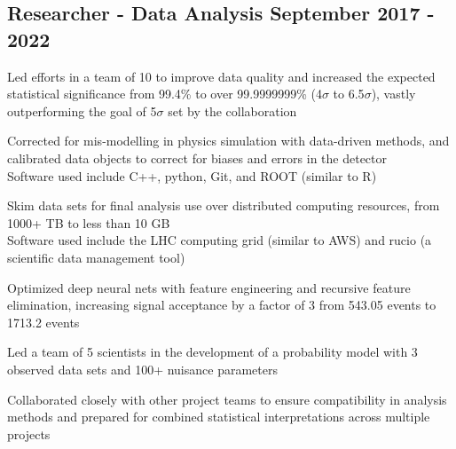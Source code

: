 \documentclass[letter,10pt]{article}
\begin{document}
\subsection{{Researcher - Data Analysis  \hfill September 2017 - 2022}}
\begin{zitemize}
\item Led efforts in a team of 10 to improve data quality and increased the expected statistical significance from 99.4\% to over 99.9999999\% (4$\sigma$ to 6.5$\sigma$), vastly outperforming the goal of 5$\sigma$ set by the collaboration
\item Corrected for mis-modelling in physics simulation with data-driven methods, and calibrated data objects to correct for biases and errors in the detector \\
Software used include C++, python, Git, and ROOT (similar to R)
\item Skim data sets for final analysis use over distributed computing resources, from  1000+ TB to less than 10 GB \\
Software used include the LHC computing grid (similar to AWS) and rucio (a scientific data management tool)
\item Optimized deep neural nets with feature engineering and recursive feature elimination, increasing signal acceptance by a factor of 3 from 543.05 events to 1713.2 events
\item Led a team of 5 scientists in the development of a probability model with 3 observed data sets and 100+ nuisance parameters
\item Collaborated closely with other project teams to ensure compatibility in analysis methods and prepared for combined statistical interpretations across multiple projects

\end{zitemize}
\end{document}

